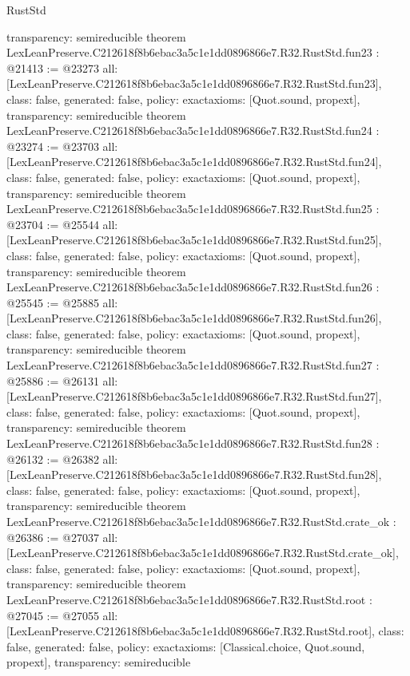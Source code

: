 \begin{lexlean}{RustStd}
\begin{coremodule}
{  transparency: semireducible
}
theorem LexLeanPreserve.C212618f8b6ebac3a5c1e1dd0896866e7.R32.RustStd.fun23 : @21413 := @23273 {
  all: [LexLeanPreserve.C212618f8b6ebac3a5c1e1dd0896866e7.R32.RustStd.fun23],
  class: false,
  generated: false,
  policy: exact{axioms: [Quot.sound, propext]},
  transparency: semireducible
}
theorem LexLeanPreserve.C212618f8b6ebac3a5c1e1dd0896866e7.R32.RustStd.fun24 : @23274 := @23703 {
  all: [LexLeanPreserve.C212618f8b6ebac3a5c1e1dd0896866e7.R32.RustStd.fun24],
  class: false,
  generated: false,
  policy: exact{axioms: [Quot.sound, propext]},
  transparency: semireducible
}
theorem LexLeanPreserve.C212618f8b6ebac3a5c1e1dd0896866e7.R32.RustStd.fun25 : @23704 := @25544 {
  all: [LexLeanPreserve.C212618f8b6ebac3a5c1e1dd0896866e7.R32.RustStd.fun25],
  class: false,
  generated: false,
  policy: exact{axioms: [Quot.sound, propext]},
  transparency: semireducible
}
theorem LexLeanPreserve.C212618f8b6ebac3a5c1e1dd0896866e7.R32.RustStd.fun26 : @25545 := @25885 {
  all: [LexLeanPreserve.C212618f8b6ebac3a5c1e1dd0896866e7.R32.RustStd.fun26],
  class: false,
  generated: false,
  policy: exact{axioms: [Quot.sound, propext]},
  transparency: semireducible
}
theorem LexLeanPreserve.C212618f8b6ebac3a5c1e1dd0896866e7.R32.RustStd.fun27 : @25886 := @26131 {
  all: [LexLeanPreserve.C212618f8b6ebac3a5c1e1dd0896866e7.R32.RustStd.fun27],
  class: false,
  generated: false,
  policy: exact{axioms: [Quot.sound, propext]},
  transparency: semireducible
}
theorem LexLeanPreserve.C212618f8b6ebac3a5c1e1dd0896866e7.R32.RustStd.fun28 : @26132 := @26382 {
  all: [LexLeanPreserve.C212618f8b6ebac3a5c1e1dd0896866e7.R32.RustStd.fun28],
  class: false,
  generated: false,
  policy: exact{axioms: [Quot.sound, propext]},
  transparency: semireducible
}
theorem LexLeanPreserve.C212618f8b6ebac3a5c1e1dd0896866e7.R32.RustStd.crate_ok : @26386 := @27037 {
  all: [LexLeanPreserve.C212618f8b6ebac3a5c1e1dd0896866e7.R32.RustStd.crate_ok],
  class: false,
  generated: false,
  policy: exact{axioms: [Quot.sound, propext]},
  transparency: semireducible
}
theorem LexLeanPreserve.C212618f8b6ebac3a5c1e1dd0896866e7.R32.RustStd.root : @27045 := @27055 {
  all: [LexLeanPreserve.C212618f8b6ebac3a5c1e1dd0896866e7.R32.RustStd.root],
  class: false,
  generated: false,
  policy: exact{axioms: [Classical.choice, Quot.sound, propext]},
  transparency: semireducible
}


\end{coremodule}
\end{lexlean}
